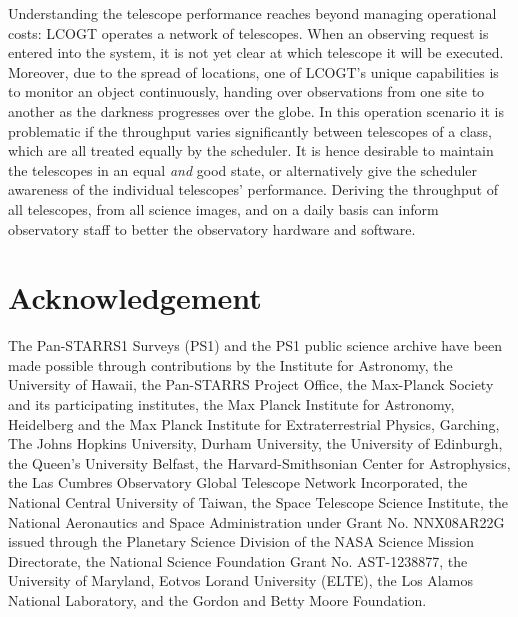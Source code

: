 \documentclass[]{spie}
\begin{document}
Understanding the telescope performance reaches beyond managing operational costs: LCOGT operates a
network of telescopes. When an observing request is entered into the system, it is not yet clear at
which telescope it will be executed. Moreover, due to the spread of locations, one of LCOGT's 
unique capabilities is to monitor an object continuously, handing over observations from one site  
to another as the darkness progresses over the globe. In this operation scenario it is problematic
if the throughput varies significantly between telescopes of a class, which are all treated equally 
by the scheduler.  It is hence desirable to maintain the telescopes in an equal {\it and} good
state, or alternatively give the scheduler awareness of the individual telescopes' performance.
Deriving the throughput of all telescopes, from all science images, and on a daily basis can inform 
observatory staff to better the observatory hardware and software.




\section{Acknowledgement}
The Pan-STARRS1 Surveys (PS1) and the PS1 public science archive have been made possible through
contributions by the Institute for Astronomy, the University of Hawaii, the Pan-STARRS Project
Office, the Max-Planck Society and its participating institutes, the Max Planck Institute for
Astronomy, Heidelberg and the Max Planck Institute for Extraterrestrial Physics, Garching, The Johns
Hopkins University, Durham University, the University of Edinburgh, the Queen's University Belfast,
the Harvard-Smithsonian Center for Astrophysics, the Las Cumbres Observatory Global Telescope
Network Incorporated, the National Central University of Taiwan, the Space Telescope Science
Institute, the National Aeronautics and Space Administration under Grant No. NNX08AR22G issued
through the Planetary Science Division of the NASA Science Mission Directorate, the National Science
Foundation Grant No. AST-1238877, the University of Maryland, Eotvos Lorand University (ELTE), the
Los Alamos National Laboratory, and the Gordon and Betty Moore Foundation.




\end{document}
